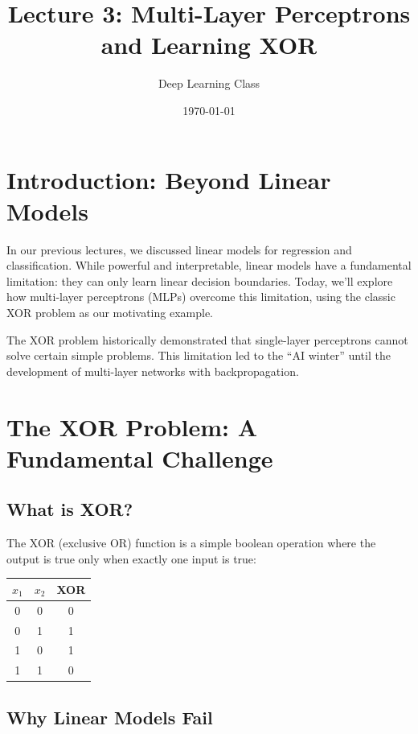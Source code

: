\documentclass{article}
\title{Lecture 3: Multi-Layer Perceptrons and Learning XOR}
\author{Deep Learning Class}
\date{\today}
\begin{document}
\maketitle

\section{Introduction: Beyond Linear Models}

In our previous lectures, we discussed linear models for regression and classification. While powerful and interpretable, linear models have a fundamental limitation: they can only learn linear decision boundaries. Today, we'll explore how multi-layer perceptrons (MLPs) overcome this limitation, using the classic XOR problem as our motivating example.

\begin{tcolorbox}[colback=yellow!5!white, colframe=orange!50!black, title=Key Insight]
The XOR problem historically demonstrated that single-layer perceptrons cannot solve certain simple problems. This limitation led to the ``AI winter'' until the development of multi-layer networks with backpropagation.
\end{tcolorbox}

\section{The XOR Problem: A Fundamental Challenge}

\subsection{What is XOR?}

The XOR (exclusive OR) function is a simple boolean operation where the output is true only when exactly one input is true:

\begin{center}
\begin{tabular}{cc|c}
$x_1$ & $x_2$ & XOR \\
\hline
0 & 0 & 0 \\
0 & 1 & 1 \\
1 & 0 & 1 \\
1 & 1 & 0 \\
\end{tabular}
\end{center}

\subsection{Why Linear Models Fail}
\end{document}

